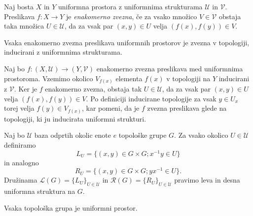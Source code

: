 \documentclass[mat1]{fmfdelo}
\newcommand{\Ucurl}{\mathcal{U}}
\begin{document}
\begin{definicija}\label{def:enakzveznost}
	Naj bosta $X$ in $Y$ uniformna prostora z uniformnima strukturama $\mathcal{U}$ in $\mathcal{V}$. Preslikava $f: X \to Y$ je \emph{enakomerno zvezna}, če za vsako množico $V \in \mathcal{V}$ obstaja taka množica $U \in \mathcal{U}$, da za vsak par $(x, y) \in U$ velja $(f(x), f(y)) \in V$.
\end{definicija}

\begin{trditev}\label{trd:enakzveznazvezna}
	Vsaka enakomerno zvezna preslikava uniformnih prostorov je zvezna v topologiji, inducirani z uniformnima strukturama.
\end{trditev}

\begin{dokaz}
	Naj bo $f\colon (X, \mathcal{U}) \to (Y, \mathcal{V})$ enakomerno zvezna preslikava med uniformnima prostoroma. Vzemimo okolico $V_{f(x)}$ elementa $f(x)$ v topologiji na $Y$ inducirani z $\mathcal{V}$. Ker je $f$ enakomerno zvezna, obstaja tak $U \in \mathcal{U}$, da za vsak par $(x, y) \in U$ velja $(f(x), f(y)) \in V$. Po definiciji inducirane topologije za vsak $y \in U_x$ torej velja $f(y) \in V_{f(x)}$, kar pomeni, da je $f$ zvezna preslikava glede na topologiji, ki ju inducirata uniformni strukturi.
\end{dokaz}

\begin{definicija}\label{def:levadesnauni}
	Naj bo $\Ucurl$ baza odprtih okolic enote $e$ topološke grupe $G$. Za vsako okolico $U \in \Ucurl$ definiramo \[L_U = \lbrace (x, y) \in G \times G ; x^{-1}y \in U \rbrace\] in analogno \[R_U = \lbrace (x, y) \in G \times G ; yx^{-1} \in U \rbrace.\] Družinama $\mathcal{L}(G) = \lbrace L_U \rbrace_{U \in \Ucurl}$ in $\mathcal{R}(G) = \lbrace R_U \rbrace_{U \in \Ucurl}$ pravimo leva in desna uniformna struktura na $G$.
\end{definicija}

\begin{trditev}\label{trd:topguniform}
	Vsaka topološka grupa je uniformni prostor.
\end{trditev}
\end{document}
